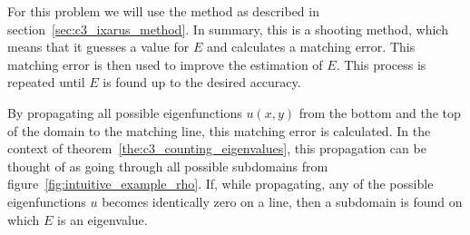 For this problem we will use the method as described in section~\ref{sec:c3_ixarus_method}. In summary, this is a shooting method, which means that it guesses a value for $E$ and calculates a matching error. This matching error is then used to improve the estimation of $E$. This process is repeated until $E$ is found up to the desired accuracy.

By propagating all possible eigenfunctions $u(x, y)$ from the bottom and the top of the domain to the matching line, this matching error is calculated. In the context of theorem~\ref{the:c3_counting_eigenvalues}, this propagation can be thought of as going through all possible subdomains from figure~\ref{fig:intuitive_example_rho}. If, while propagating, any of the possible eigenfunctions $u$ becomes identically zero on a line, then a subdomain is found on which $E$ is an eigenvalue.

